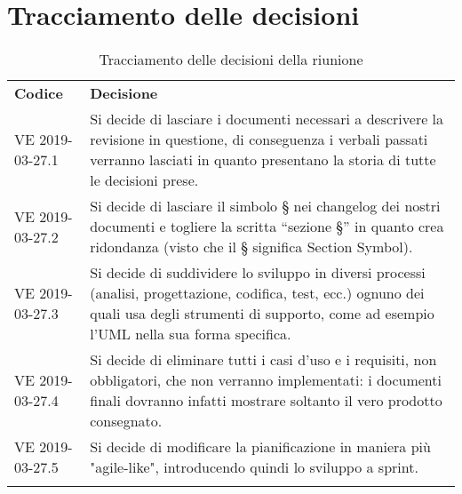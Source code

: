 \clearpage
\section{Tracciamento delle decisioni}
\begin{center}
	\renewcommand{\arraystretch}{1.5}
	\begin{longtable}{  p{2.8cm} p{11.4cm} }
		\rowcolor{tableHeadYellow}
		\textbf{Codice}&\textbf{Decisione}\\
		VE 2019-03-27.1 & Si decide di lasciare i documenti necessari a descrivere la revisione in questione, di conseguenza i verbali passati verranno lasciati in quanto presentano la storia di tutte le decisioni prese.\\
		VE 2019-03-27.2 & Si decide di lasciare il simbolo § nei changelog dei nostri documenti e togliere la scritta “sezione §” in quanto crea ridondanza (visto che il § significa Section Symbol).\\
		VE 2019-03-27.3 & Si decide di suddividere lo sviluppo in diversi processi (analisi, progettazione, codifica, test, ecc.) ognuno dei quali usa degli strumenti di supporto, come ad esempio l’UML nella sua forma specifica.\\
		VE 2019-03-27.4 & Si decide di eliminare tutti i casi d’uso e i requisiti, non obbligatori, che non verranno implementati: i documenti finali dovranno infatti mostrare soltanto il vero prodotto consegnato.\\
		VE 2019-03-27.5 & Si decide di modificare la pianificazione in maniera più "agile-like", introducendo quindi lo sviluppo a sprint.\\
		\rowcolor{white}
		\caption{Tracciamento delle decisioni della riunione}
	\end{longtable}	
\end{center}